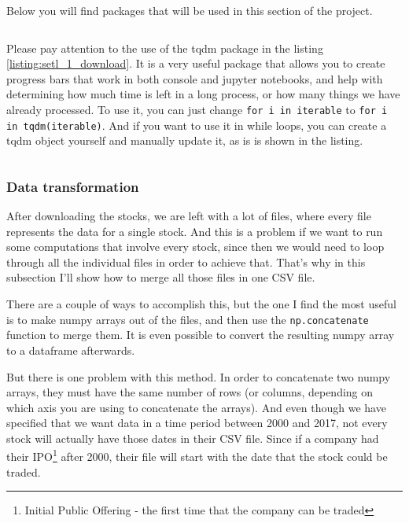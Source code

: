 \documentclass[12pt, a4paper]{article}
\begin{document}

Below you will find packages that will be used in this section of the project.

\bgroup
  \inputminted[linenos, breaklines=true, fontsize=\scriptsize, firstnumber=last]{python}{src/stocks/etl/0a_imports.py}
  \label{listing:setl_0a_imports}
\egroup



Please pay attention to the use of the tqdm package in the listing \ref{listing:setl_1_download}. It is a very useful package that allows you to create progress bars that work in both console and jupyter notebooks, and help with determining how much time is left in a long process, or how many things we have already processed. To use it, you can just change \texttt{for i in iterable} to \texttt{for i in tqdm(iterable)}. And if you want to use it in while loops, you can create a tqdm object yourself and manually update it, as is is shown in the listing.

\bgroup
  \inputminted[linenos, breaklines=true, fontsize=\scriptsize]{python}{src/stocks/etl/1_download.py}
  \label{listing:setl_1_download}
\egroup

\subsubsection{Data transformation}

After downloading the stocks, we are left with a lot of files, where every file represents the data for a single stock. And this is a problem if we want to run some computations that involve every stock, since then we would need to loop through all the individual files in order to achieve that. That’s why in this subsection I’ll show how to merge all those files in one CSV file.

There are a couple of ways to accomplish this, but the one I find the most useful is to make numpy arrays out of the files, and then use the \texttt{np.concatenate} function to merge them. It is even possible to convert the resulting numpy array to a dataframe afterwards.

But there is one problem with this method. In order to  concatenate two numpy arrays, they must have the same number of rows (or columns, depending on which axis you are using to concatenate the arrays). And even though we have specified that we want data in a time period between 2000 and 2017, not every stock will actually have those dates in their CSV file. Since if a company had their IPO\footnote{Initial Public Offering - the first time that the company can be traded} after 2000, their file will start with the date that the stock could be traded.
\end{document}
